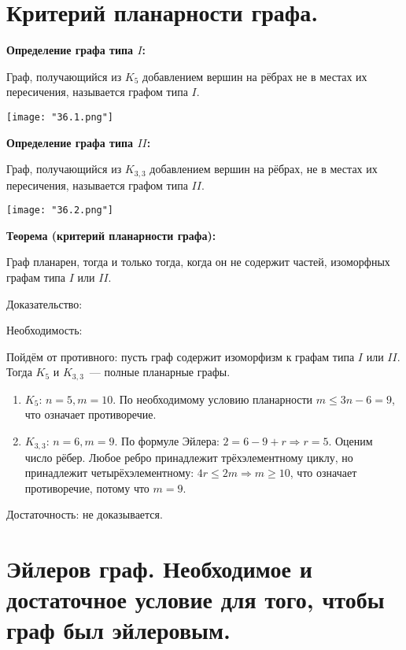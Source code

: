 \section{Критерий планарности графа.}

\textbf{Определение графа типа $I$:}
    \smallskip

    Граф, получающийся из $K_5$ добавлением вершин на рёбрах
    не в местах их пересичения, называется графом типа $I$.

    \begin{center}
        \texttt{[image: "36.1.png"]}
    \end{center}
    \bigskip

\textbf{Определение графа типа $II$:}    
\smallskip

    Граф, получающийся из $K_{3,3}$ добавлением вершин на рёбрах, не в местах
    их пересичения, называется графом типа $II$.

    \begin{center}
        \texttt{[image: "36.2.png"]}
    \end{center}
    \bigskip

\textbf{Теорема (критерий планарности графа):}
    \smallskip
    
    Граф планарен, тогда и только тогда, когда он не содержит частей, изоморфных
    графам типа $I$ или $II$.
    \bigskip

    Доказательство:
    \bigskip

    Необходимость:
    \smallskip

    Пойдём от противного: пусть граф содержит изоморфизм к графам типа $I$ или $II$.
    Тогда $K_5$ и $K_{3, 3}$~--- полные планарные графы.

    \begin{enumerate}
        \item{$K_5$: $n = 5, m = 10$. По необходимому условию планарности
        $m \leq 3n - 6 = 9$, что означает противоречие.}
        \item{$K_{3,3}$: $n = 6, m = 9$. По формуле Эйлера: $2 = 6 - 9 + r
        \Rightarrow r = 5$. Оценим число рёбер. Любое ребро принадлежит трёхэлементному
        циклу, но принадлежит четырёхэлементному: $4r \leq 2m \Rightarrow m \geq 10$,
        что означает противоречие, потому что $m = 9$.}
    \end{enumerate}
    \bigskip

    Достаточность: не доказывается.

\section{Эйлеров граф. Необходимое и достаточное условие для того, чтобы граф был 
эйлеровым.}    

